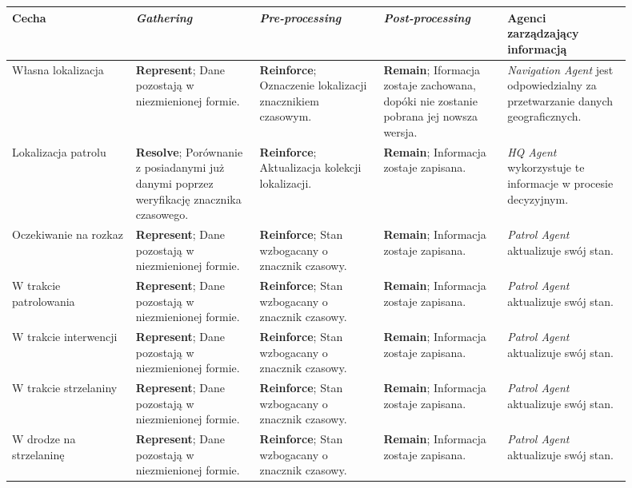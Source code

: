 \begin{landscape}
    \begin{longtable}{|p{0.18\linewidth}|p{0.18\linewidth}|p{0.18\linewidth}|p{0.18\linewidth}|p{0.18\linewidth}|}
    \hline
    Cecha & \emph{Gathering} & \emph{Pre-processing} & \emph{Post-processing} & Agenci zarządzający informacją \\
    \hline
    \hline

     Własna lokalizacja & \textbf{Represent}; Dane pozostają w niezmienionej formie. & \textbf{Reinforce}; Oznaczenie lokalizacji znacznikiem czasowym. & \textbf{Remain}; Iformacja zostaje zachowana, dopóki nie zostanie pobrana jej nowsza wersja.  & \emph{Navigation Agent} jest odpowiedzialny za przetwarzanie danych geograficznych. \\
     \hline
     Lokalizacja patrolu & \textbf{Resolve}; Porównanie z posiadanymi już danymi poprzez weryfikację znacznika czasowego. & \textbf{Reinforce}; Aktualizacja kolekcji lokalizacji. & \textbf{Remain}; Informacja zostaje zapisana. & \emph{HQ Agent} wykorzystuje te informacje w procesie decyzyjnym. \\
     \hline
     Oczekiwanie na rozkaz & \textbf{Represent}; Dane pozostają w niezmienionej formie. & \textbf{Reinforce}; Stan wzbogacany o znacznik czasowy. & \textbf{Remain}; Informacja zostaje zapisana. & \emph{Patrol Agent} aktualizuje swój stan. \\
     \hline
     W trakcie patrolowania & \textbf{Represent}; Dane pozostają w niezmienionej formie. & \textbf{Reinforce}; Stan wzbogacany o znacznik czasowy. & \textbf{Remain}; Informacja zostaje zapisana. & \emph{Patrol Agent} aktualizuje swój stan. \\
     \hline
     W trakcie interwencji & \textbf{Represent}; Dane pozostają w niezmienionej formie. & \textbf{Reinforce}; Stan wzbogacany o znacznik czasowy. & \textbf{Remain}; Informacja zostaje zapisana. & \emph{Patrol Agent} aktualizuje swój stan. \\
     \hline
     W trakcie strzelaniny & \textbf{Represent}; Dane pozostają w niezmienionej formie. & \textbf{Reinforce}; Stan wzbogacany o znacznik czasowy. & \textbf{Remain}; Informacja zostaje zapisana. & \emph{Patrol Agent} aktualizuje swój stan. \\
     \hline
     W drodze na strzelaninę & \textbf{Represent}; Dane pozostają w niezmienionej formie. & \textbf{Reinforce}; Stan wzbogacany o znacznik czasowy. & \textbf{Remain}; Informacja zostaje zapisana. & \emph{Patrol Agent} aktualizuje swój stan. \\

\end{longtable}
\end{landscape}
